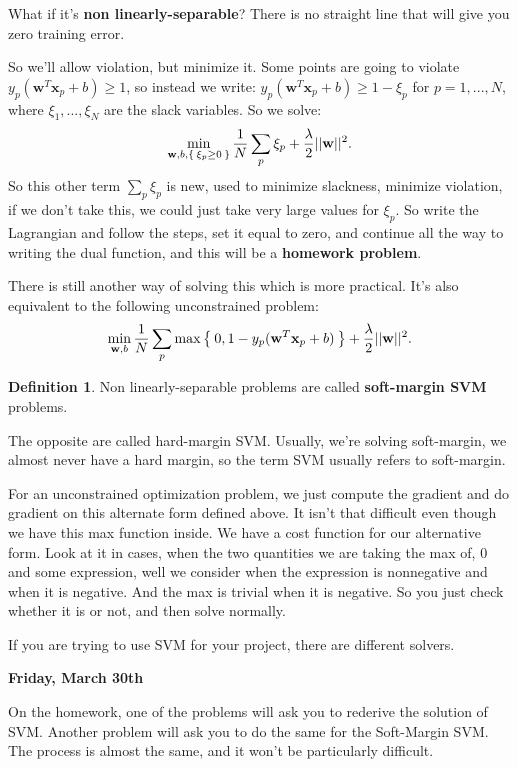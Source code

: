 \documentclass{amsbook}
\theoremstyle{plain}
\numberwithin{section}{chapter}
\numberwithin{equation}{chapter}
\theoremstyle{definition}
\newtheorem{Def}[theorem]{Definition}
\theoremstyle{remark}
\newcommand{\bb}{\vspace{3mm}}
\newcommand{\vecc}{\mathbf}
\newcommand{\bee}{\begin{equation}\begin{aligned}}
\newcommand{\eee}{\end{aligned}\end{equation}}
\newcommand{\fracc}{\frac}
\begin{document}
What if it's \textbf{non linearly-separable}? There is no straight line that will give you zero training error. 


So we'll allow violation, but minimize it. Some points are going to violate $y_p(\vecc{w}^T\vecc{x}_p + b) \geq 1$, so instead we write:  $y_p(\vecc{w}^T\vecc{x}_p + b) \geq 1 - \xi_p$ for $p = 1,...,N$, where $\xi_1,...,\xi_N$ are the slack variables. So we solve: 
$$
\min_{\vecc{w},b, \Set{\xi_p \geq 0}} \fracc{1}{N} \sum_p \xi_p + \fracc{\lambda}{2}||\vecc{w}||^2.
$$ So this other term $\sum_p \xi_p$ is new, used to minimize slackness, minimize violation, if we don't take this, we could just take very large values for $\xi_p$. So write the Lagrangian and follow the steps, set it equal to zero, and continue all the way to writing the dual function, and this will be a \textbf{homework problem}. 

There is still another way of solving this which is more practical. It's also equivalent to the following unconstrained problem:
\bee
\min_{\vecc{w},b} \fracc{1}{N}\sum_p \max \Set{0,1 - y_p(\vecc{w}^T\vecc{x}_p + b)} + \fracc{\lambda}{2}||\vecc{w}||^2. 
\eee

\begin{Def}
Non linearly-separable problems are called \textbf{soft-margin SVM} problems. 
\end{Def}

The opposite are called hard-margin SVM. Usually, we're solving soft-margin, we almost never have a hard margin, so the term SVM usually refers to soft-margin. 

For an unconstrained optimization problem, we just compute the gradient and do gradient on this alternate form defined above. It isn't that difficult even though we have this max function inside. We have a cost function for our alternative form. Look at it in cases, when the two quantities we are taking the max of, 0 and some expression, well we consider when the expression is nonnegative and when it is negative. And the max is trivial when it is negative. So you just check whether it is or not, and then solve normally. 


If you are trying to use SVM for your project, there are different solvers. 


\bb

\textbf{Friday, March 30th}





On the homework, one of the problems will ask you to rederive the solution of SVM. Another problem will ask you to do the same for the Soft-Margin SVM. The process is almost the same, and it won't be particularly difficult. 
\end{document}
